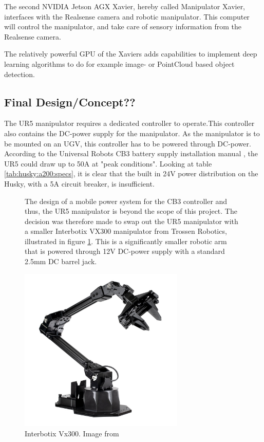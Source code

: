 The second NVIDIA Jetson AGX Xavier, hereby called Manipulator Xavier, interfaces with the Realsense camera and robotic manipulator. This computer will control the manipulator, and take care of sensory information from the Realsense camera. 

The relatively powerful GPU of the Xaviers adds capabilities to implement deep learning algorithms to do for example image- or PointCloud based object detection.

\subsection{Final Design/Concept??}

The UR5 manipulator requires a dedicated controller to operate.This controller also contains the DC-power supply for the manipulator. As the manipulator is to be mounted on an UGV, this controller has to be powered through DC-power. According to the Universal Robots CB3 battery supply installation manual \cite{ur5_battery_manual}, the UR5 could draw up to 50A at "peak conditions". Looking at table \ref{tab:husky:a200:specs}, it is clear that the built in 24V power distribution on the Husky, with a 5A circuit breaker, is insufficient.

\begin{figure}[H]
  \centering
  \begin{minipage}[b]{0.49\textwidth}
        \centering
        The design of a mobile power system for the CB3 controller and thus, the UR5 manipulator is beyond the scope of this project. The decision was therefore made to swap out the UR5 manipulator with a smaller Interbotix VX300 manipulator from Trossen Robotics, illustrated in figure \ref{fig:vx300}. This is a significantly smaller robotic arm that is powered through 12V DC-power supply with a standard 2.5mm DC barrel jack. 
  \end{minipage}
  \hfill
  \begin{minipage}[b]{0.49\textwidth}
   \centering
  \includegraphics[width = 0.7\textwidth]{Figures/VX300.jpg}
  \caption{Interbotix Vx300. Image from \cite{interbotix_vx300}}
  \label{fig:vx300}
  \end{minipage}
\end{figure}





